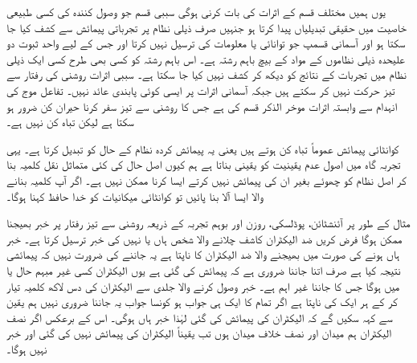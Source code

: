 یوں ہمیں مختلف قسم کے اثرات کی بات کرنی ہوگی سببی قسم جو وصول کنندہ کی کسی طبیعی خاصیت میں حقیقی تبدیلیاں پیدا کرتا ہو جنہیں صرف ذیلی نظام پر تجرباتی پیمائش سے کشف کیا جا سکتا ہو اور آسمانی  قسمپ جو توانائی یا معلومات کی ترسیل نہیں کرتا اور جس کے لیے واحد ثبوت دو علیحدہ ذیلی نظاموں کے مواد کے بیچ باہم رشتہ ہے۔ اس باہم رشتہ کو کسی بھی طرح کسی ایک ذیلی نظام میں تجربات کے نتائج کو دیکھ کر کشف نہیں کیا جا سکتا ہے۔ سببی اثرات  روشنی کی رفتار سے تیز حرکت نہیں کر سکتے ہیں جبکہ آسمانی  اثرات پر ایسی کوئی پابندی عائد نہیں۔ تفاعل موج کی انہدام سے وابستہ اثرات موخر الذکر قسم کی ہے جس کا روشنی سے تیز سفر کرنا حیران کن ضرور ہو سکتا ہے لیکن تباہ کن نہیں ہے۔

کوانٹائی پیمائش عموماً تباہ کن ہوتے ہیں یعنی یہ پیمائش کردہ نظام کے حال کو تبدیل کرتا ہے۔ یہی تجربہ گاہ میں اصول عدم یقینیت کو یقینی بناتا ہے ہم کیوں اصل حال کی کئی متماثل نقل کلمیہ بنا کر اصل نظام کو چھوئے بغیر ان کی پیمائش نہیں کرتے ایسا کرنا ممکن نہیں ہے۔ اگر آپ کلمیہ بنانے والا ایسا آلا بنا پائیں تو کوانٹائی میکانیات کو خدا حافظ کہنا ہوگا۔

مثال کے طور پر آئنشٹائن، پوڈلسکی، روزن اور بوہم تجربہ کے ذریعہ روشنی سے تیز رفتار پر خبر بھیجنا ممکن ہوگا فرض کریں ضد الیکٹران کاشف چلانے والا شخص ہاں یا نہیں کی خبر ترسیل کرتا ہے۔ خبر ہاں ہونے کی صورت میں بھیجنے والا ضد الیکٹران کا  ناپتا ہے یہ جاننے کی ضرورت نہیں کہ پیمائشی نتیجہ کیا ہے صرف اتنا جاننا ضروری ہے کہ پیمائش کی گئی ہے یوں الیکٹران کسی غیر مبہم حال  یا  میں ہوگا جس کا جاننا غیر اہم ہے۔ خبر وصول کرنے والا جلدی سے الیکٹران کی دس لاکھ کلمیہ تیار کر کے ہر ایک کی  ناپتا ہے اگر تمام کا ایک ہی جواب ہو کونسا جواب یہ جاننا ضروری نہیں ہم یقین سے کہہ سکیں گے کہ الیکٹران کی پیمائش کی گئی لہٰذا خبر ہاں ہوگی۔ اس کے برعکس اگر نصف الیکٹران ہم میدان اور نصف خلاف میدان ہوں تب یقیناً الیکٹران کی پیمائش نہیں کی گئی اور خبر نہیں ہوگا۔

